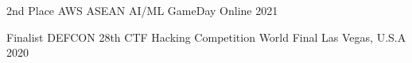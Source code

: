 

\begin{cvhonors}

  \cvhonor
  {2nd Place} %
  {AWS ASEAN AI/ML GameDay} %
  {Online} %
  {2021} %

  \cvhonor
  {Finalist} %
  {DEFCON 28th CTF Hacking Competition World Final} %
  {Las Vegas, U.S.A} %
  {2020} %

\end{cvhonors}


